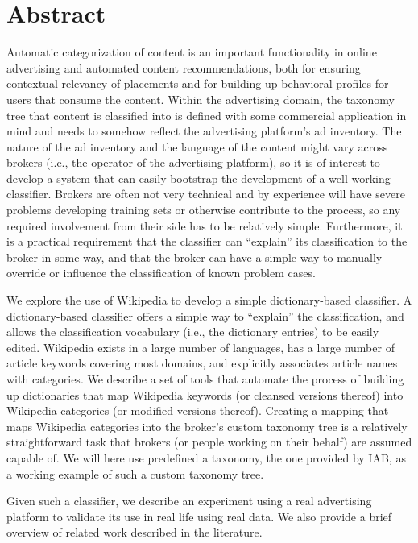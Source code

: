 \chapter*{Abstract}
Automatic categorization of content is an important %
functionality in online advertising and automated content recommendations, both for ensuring contextual relevancy of placements and for building up behavioral profiles for users that consume the content. Within the advertising domain, the taxonomy tree that content is classified into is defined with some commercial application in mind and needs to somehow reflect the advertising platform’s ad inventory. The nature of the ad inventory and the language of the content might vary across brokers (i.e., the operator of the advertising platform), so it is of interest to develop a system that can easily bootstrap the development of a well-working classifier. Brokers are often not very technical and by experience will have severe problems developing training sets or otherwise contribute to the process, so any required involvement from their side has to be relatively simple. Furthermore, it is a practical requirement that the classifier can “explain” its classification to the broker in some way, and that the broker can have a simple way to manually override or influence the classification of known problem cases.

We explore the use of Wikipedia to develop a simple dictionary-based classifier. A dictionary-based classifier offers a simple way to “explain” the classification, and allows the classification vocabulary (i.e., the dictionary entries) to be easily edited. Wikipedia exists in a large number of languages, has a large number of article keywords covering most domains, and explicitly associates article names with categories. We describe a set of tools that automate the process of building up dictionaries that map Wikipedia keywords (or cleansed versions thereof) into Wikipedia categories (or modified versions thereof). Creating a mapping that maps Wikipedia categories into the broker’s custom taxonomy tree is a relatively straightforward task that brokers (or people working on their behalf) are assumed capable of. We will here use predefined a taxonomy, the one provided by IAB, as a working example of such a custom taxonomy tree.

Given such a classifier, we describe an experiment using a real advertising platform to validate its use in real life using real data. We also provide a brief overview of related work described in the literature.